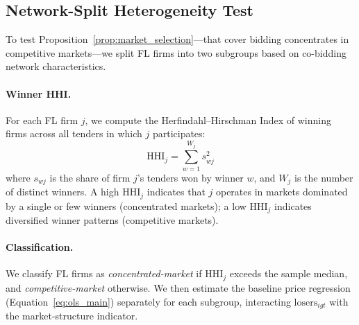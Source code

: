 
\subsection{Network-Split Heterogeneity Test}
\label{sec:empirical_network}

To test Proposition~\ref{prop:market_selection}---that cover bidding
concentrates in competitive markets---we split FL firms into two
subgroups based on co-bidding network characteristics.

\paragraph{Winner HHI.}
For each FL firm $j$, we compute the Herfindahl--Hirschman Index of
winning firms across all tenders in which $j$ participates:
\begin{equation}
  \text{HHI}_j = \sum_{w=1}^{W_j} s_{wj}^2
  \label{eq:winner_hhi}
\end{equation}
where $s_{wj}$ is the share of firm $j$'s tenders won by winner $w$,
and $W_j$ is the number of distinct winners. A high $\text{HHI}_j$
indicates that $j$ operates in markets dominated by a single or few
winners (concentrated markets); a low $\text{HHI}_j$ indicates
diversified winner patterns (competitive markets).

\paragraph{Classification.}
We classify FL firms as \emph{concentrated-market} if
$\text{HHI}_j$ exceeds the sample median, and
\emph{competitive-market} otherwise. We then estimate the baseline
price regression (Equation~\ref{eq:ols_main}) separately for each
subgroup, interacting $\text{losers}_{igt}$ with the
market-structure indicator.
